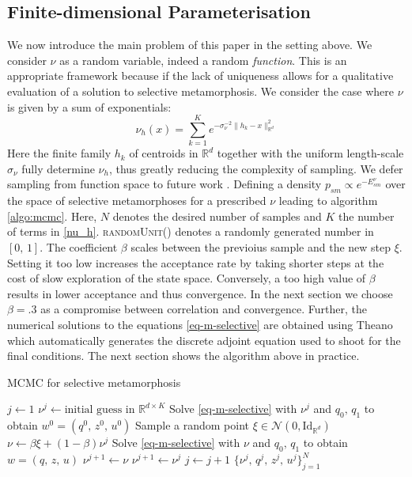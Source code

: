\documentclass[runningheads]{llncs}
\newcommand{\Rd}{\mathbb{R}^{d}}
\newcommand{\RdK}{\mathbb{R}^{d\times K}}
\begin{document}
\subsection{Finite-dimensional Parameterisation}\label{subs:finite-dim-param}

We now introduce the main problem of this paper in the setting above. We
consider $\nu$ as a random variable, indeed a random \emph{function}. This is an
appropriate framework because if the lack of uniqueness allows for a qualitative
evaluation of a solution to selective metamorphosis. We consider the case where
$\nu$ is given by a sum of exponentials:
\begin{equation}\label{nu_h}
    \nu_h (x) = \sum_{k=1}^K e^{ -\sigma_\nu^{-2}\|h_k - x\|_{\Rd}^2}
\end{equation}
Here the finite family $h_k$ of centroids in $\Rd$ together with the uniform
length-scale $\sigma_\nu$ fully determine $\nu_h$, thus greatly reducing the
complexity of sampling. We defer sampling from function space to future work
\cite{bockarnaudoncotter2019}. Defining a density $p_{sm} \propto e^{-
E_{sm}^\nu}$ over the space of selective metamorphoses for a prescribed $\nu$
leading to algorithm \ref{algo:mcmc}. Here, $N$ denotes the desired number of
samples and $K$ the number of terms in \eqref{nu_h}. \textsc{randomUnit()}
denotes a randomly generated number in $[0,\,1]$. The coefficient $\beta$ scales
between the previoius sample and the new step $\xi$. Setting it too low
increases the acceptance rate by taking shorter steps at the cost of slow
exploration of the state space. Conversely, a too high value of $\beta$ results
in lower acceptance and thus convergence. In the next section we choose
$\beta=.3$ as a compromise between correlation and convergence. Further, the
numerical solutions to the equations \eqref{eq-m-selective} are obtained using
Theano \cite{team2016theano} which automatically generates the discrete adjoint
equation used to shoot for the final conditions. The next section shows the
algorithm above in practice.
\begin{algorithm}[h!]
\begin{algorithmic}
\caption{MCMC for selective metamorphosis}\label{algo:mcmc}
\Procedure{mcmcSM}{$N$, $K$, $q_0$, $q_1$, $\beta\in (0,1]$}
\State $j \gets 1$
\State $\nu^j \gets \text{initial guess in } \RdK$
\State Solve \eqref{eq-m-selective} with $\nu^j$ and $q_0,\,q_1$ to obtain $w^0 = (q^0,\, z^0,\, u^0)$
\State Sample a random point $\xi \in \mathcal N(0, \text{Id}_{\mathbb R^d})$
\State $\nu \gets \beta \xi + (1-\beta) \nu^j$
\State Solve \eqref{eq-m-selective} with $\nu$ and $q_0,\,q_1$ to obtain $w = (q,\, z,\, u)$
    \State $\nu^{j+1} \gets \nu$
\Else
    \State $\nu^{j+1} \gets \nu^j$
\EndIf
\State $j\gets j+1$
\EndWhile
\Return $\{\nu^j,\, q^j,\, z^j,\, u^j\}_{j=1}^N$
\EndProcedure
\end{algorithmic}
\end{algorithm}
\end{document}
